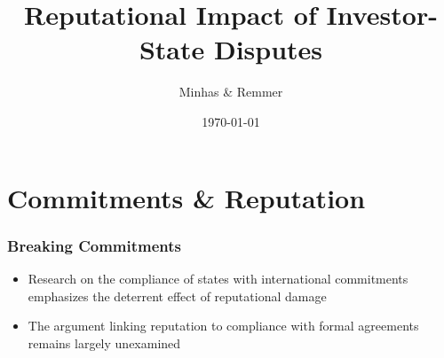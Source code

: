 \documentclass[10pt]{beamer}
\title[Contingent Institutions \hspace{14em} \insertframenumber/
\inserttotalframenumber]{Reputational Impact of Investor-State Disputes}
\author{Minhas \& Remmer}
\institute[Duke University]
{
{\emph{sfm12@duke.edu}} \\
\medskip
Duke University 
}
\date{\today}
\begin{document}
\begin{frame}
\titlepage
\end{frame}

\section{Commitments \& Reputation}

\begin{frame}
\frametitle{Breaking Commitments}

\begin{itemize}
	\item Research on the compliance of states with international commitments emphasizes the deterrent effect of reputational damage
	\item The argument linking reputation to compliance with formal agreements remains largely unexamined
\end{itemize}

\end{frame}
\end{document}

